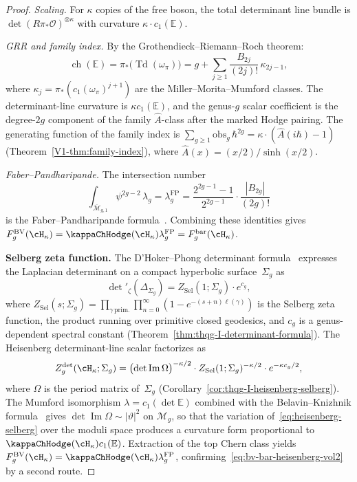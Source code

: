 \begin{proof}
\emph{Scaling.} For $\kappa$ copies of the free boson, the total
determinant line bundle is
$\det(R\pi_*\mathcal{O})^{\otimes\kappa}$
with curvature $\kappa \cdot c_1(\mathbb{E})$.

\emph{GRR and family index.} By the Grothendieck--Riemann--Roch theorem:
\[
\operatorname{ch}(\mathbb{E})
= \pi_*\bigl(\operatorname{Td}(\omega_\pi)\bigr)
= g + \sum_{j \geq 1}
\frac{B_{2j}}{(2j)!}\,\kappa_{2j-1},
\]
where $\kappa_j = \pi_*(c_1(\omega_\pi)^{j+1})$ are the
Miller--Morita--Mumford classes. The determinant-line curvature is
$\kappa c_1(\mathbb E)$, and the genus-$g$ scalar coefficient is
the degree-$2g$ component of the family $\hat A$-class after the
marked Hodge pairing. The generating function of the family index is
$\sum_{g \geq 1}\mathrm{obs}_g\,\hbar^{2g}
= \kappa\cdot(\hat{A}(i\hbar) - 1)$
\textup{(}Theorem~\ref{V1-thm:family-index}\textup{)},
where $\hat{A}(x) = (x/2)/\sinh(x/2)$.

\emph{Faber--Pandharipande.} The intersection number
\[
\int_{\overline{\mathcal{M}}_{g,1}}
\psi^{2g-2}\,\lambda_g
= \lambda_g^{\mathrm{FP}}
= \frac{2^{2g-1}-1}{2^{2g-1}}
\cdot \frac{|B_{2g}|}{(2g)!}
\]
is the Faber--Pandharipande formula~\cite{FP00}.
Combining these identities gives
$F_g^{\mathrm{BV}}(\cH_\kappa)
= \kappaChHodge(\cH_\kappa)\lambda_g^{\mathrm{FP}}
= F_g^{\mathrm{bar}}(\cH_\kappa)$.

\medskip
\noindent\textbf{Selberg zeta function.}
The D'Hoker--Phong determinant formula~\cite{DP86} expresses
the Laplacian determinant on a compact hyperbolic
surface~$\Sigma_g$ as
\begin{equation}\label{eq:dhoker-phong-det}
\det\nolimits'_\zeta(\Delta_{\Sigma_g})
= Z_{\mathrm{Sel}}(1;\Sigma_g)\cdot e^{c_g},
\end{equation}
where $Z_{\mathrm{Sel}}(s;\Sigma_g)
= \prod_{\gamma\, \text{prim.}} \prod_{n=0}^\infty
(1 - e^{-(s+n)\ell(\gamma)})$
is the Selberg zeta function, the product running
over primitive closed geodesics, and $c_g$ is a genus-dependent
spectral constant
\textup{(}Theorem~\ref{thm:thqg-I-determinant-formula}\textup{)}.
The Heisenberg determinant-line scalar factorizes as
\begin{equation}\label{eq:heisenberg-selberg}
Z_g^{\mathrm{det}}(\cH_\kappa;\Sigma_g)
= \bigl(\det\operatorname{Im}\Omega\bigr)^{-\kappa/2}
\cdot Z_{\mathrm{Sel}}(1;\Sigma_g)^{-\kappa/2}
\cdot e^{-\kappa c_g/2},
\end{equation}
where $\Omega$ is the period matrix of~$\Sigma_g$
\textup{(}Corollary~\ref{cor:thqg-I-heisenberg-selberg}\textup{)}.
The Mumford isomorphism
$\lambda = c_1(\det\mathbb{E})$ combined with the
Belavin--Knizhnik formula~\cite{BK86} gives
$\det\operatorname{Im}\Omega \sim |\vartheta|^2$ on
$\mathcal{M}_g$, so that the variation of~\eqref{eq:heisenberg-selberg}
over the moduli space produces a curvature form proportional
to $\kappaChHodge(\cH_\kappa)c_1(\mathbb{E})$. Extraction of
the top Chern class yields
$F_g^{\mathrm{BV}}(\cH_\kappa)
= \kappaChHodge(\cH_\kappa)\lambda_g^{\mathrm{FP}}$,
confirming~\eqref{eq:bv-bar-heisenberg-vol2} by a second route.


\end{proof}
